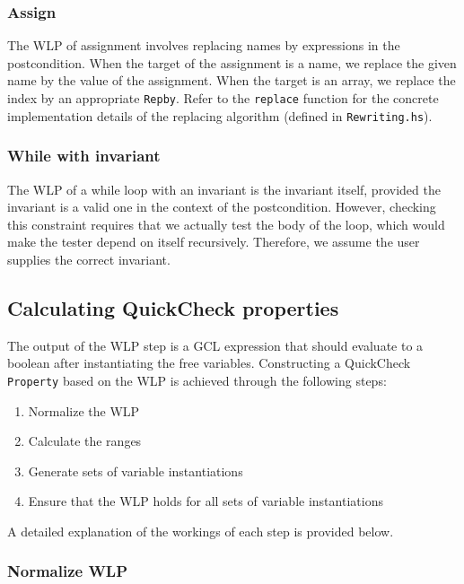 \documentclass[a4paper]{article}
\begin{document}

\subsubsection*{Assign}

The WLP of assignment involves replacing names by expressions in the postcondition.
When the target of the assignment is a name, we replace the given name by the value
of the assignment. When the target is an array, we replace the index by an appropriate
\texttt{Repby}. Refer to the \texttt{replace} function for the concrete implementation
details of the replacing algorithm (defined in \texttt{Rewriting.hs}).

\subsubsection*{While with invariant}

The WLP of a while loop with an invariant is the invariant itself, provided the
invariant is a valid one in the context of the postcondition. However, checking
this constraint requires that we actually test the body of the loop, which
would make the tester depend on itself recursively. Therefore, we assume the
user supplies the correct invariant.

\subsection{Calculating QuickCheck properties}

The output of the WLP step is a GCL expression that should evaluate to a boolean
after instantiating the free variables. Constructing a QuickCheck \texttt{Property}
based on the WLP is achieved through the following steps:

\begin{enumerate}
\item Normalize the WLP
\item Calculate the ranges
\item Generate sets of variable instantiations
\item Ensure that the WLP holds for all sets of variable instantiations
\end{enumerate}

A detailed explanation of the workings of each step is provided below.

\subsubsection*{Normalize WLP}
\end{document}
